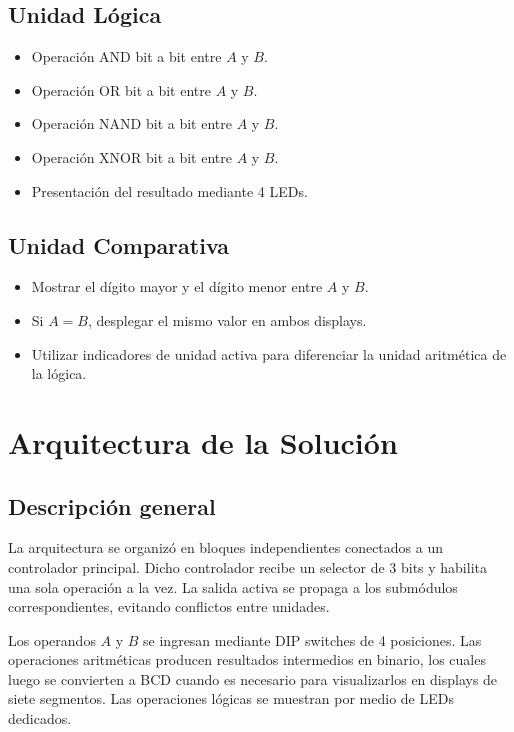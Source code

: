 \documentclass[12pt,a4paper]{article}
\begin{document}
\subsection{Unidad Lógica}
\begin{itemize}[leftmargin=1.2cm]
    \item Operación AND bit a bit entre $A$ y $B$.
    \item Operación OR bit a bit entre $A$ y $B$.
    \item Operación NAND bit a bit entre $A$ y $B$.
    \item Operación XNOR bit a bit entre $A$ y $B$.
    \item Presentación del resultado mediante 4 LEDs.
\end{itemize}

\subsection{Unidad Comparativa}
\begin{itemize}[leftmargin=1.2cm]
    \item Mostrar el dígito mayor y el dígito menor entre $A$ y $B$.
    \item Si $A = B$, desplegar el mismo valor en ambos displays.
    \item Utilizar indicadores de unidad activa para diferenciar la unidad aritmética de la lógica.
\end{itemize}

\section{Arquitectura de la Solución}

\subsection{Descripción general}
La arquitectura se organizó en bloques independientes conectados a un controlador principal. Dicho controlador recibe un selector de 3 bits y habilita una sola operación a la vez. La salida activa se propaga a los submódulos correspondientes, evitando conflictos entre unidades.

Los operandos $A$ y $B$ se ingresan mediante DIP switches de 4 posiciones. Las operaciones aritméticas producen resultados intermedios en binario, los cuales luego se convierten a BCD cuando es necesario para visualizarlos en displays de siete segmentos. Las operaciones lógicas se muestran por medio de LEDs dedicados.
\end{document}

